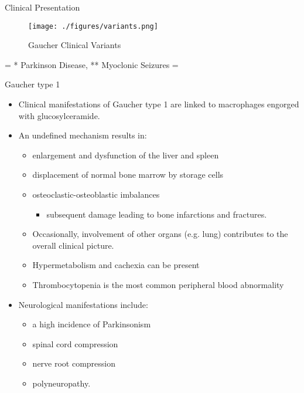 \documentclass[presentation, smaller]{beamer}
\begin{document}
\begin{frame}[label={sec:orgheadline8}]{Clinical Presentation}
\begin{figure}[htb]
\centering
\texttt{[image: ./figures/variants.png]}
\caption[variants]{\label{tab:variants2}
Gaucher Clinical Variants}
\end{figure}


\tiny 
= * Parkinson Disease, ** Myoclonic Seizures =
\end{frame}
\begin{frame}[label={sec:orgheadline9}]{Gaucher type 1}
\begin{itemize}
\item Clinical manifestations of Gaucher type 1 are linked to macrophages
engorged with glucosylceramide.

\item An undefined mechanism results in:
\begin{itemize}
\item enlargement and dysfunction of the liver and spleen
\item displacement of normal bone marrow by storage cells
\item osteoclastic-osteoblastic imbalances
\begin{itemize}
\item subsequent damage leading to bone infarctions and fractures.
\end{itemize}
\item Occasionally, involvement of other organs (e.g. lung) contributes
to the overall clinical picture.
\item Hypermetabolism and cachexia can be present
\item Thrombocytopenia is the most common peripheral blood abnormality
\end{itemize}

\item Neurological manifestations include:
\begin{itemize}
\item a high incidence of Parkinsonism
\item spinal cord compression
\item nerve root compression
\item polyneuropathy.
\end{itemize}
\end{itemize}
\end{frame}
\end{document}
